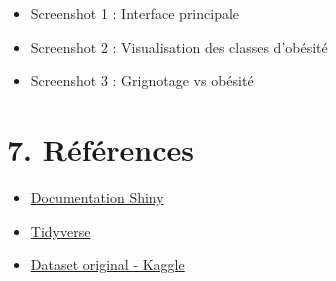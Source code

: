 \documentclass[
]{article}
\providecommand{\tightlist}{%
  \setlength{\itemsep}{0pt}\setlength{\parskip}{0pt}}
\begin{document}
\begin{itemize}
\tightlist
\item
  Screenshot 1 : Interface principale
\item
  Screenshot 2 : Visualisation des classes d'obésité
\item
  Screenshot 3 : Grignotage vs obésité
\end{itemize}

\section{7. Références}\label{ruxe9fuxe9rences}

\begin{itemize}
\tightlist
\item
  \href{https://shiny.posit.co/}{Documentation Shiny}
\item
  \href{https://www.tidyverse.org/}{Tidyverse}
\item
  \href{https://www.kaggle.com/datasets/}{Dataset original - Kaggle}
\end{itemize}
\end{document}
